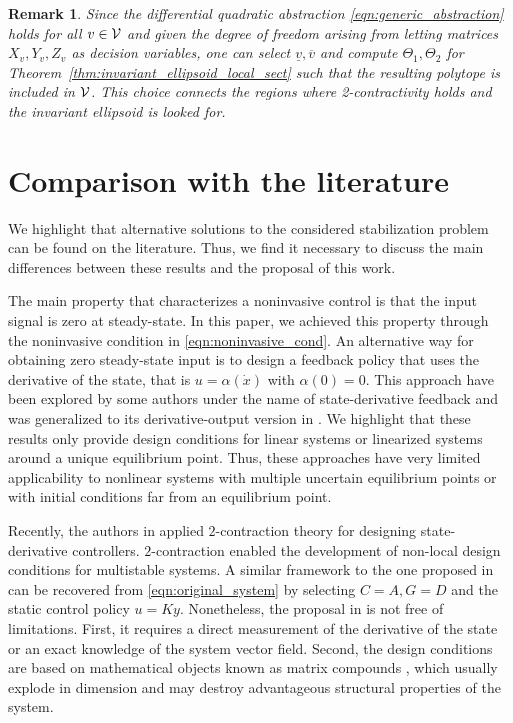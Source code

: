 \documentclass{ifacconf}
\newtheorem{remark}{Remark}
\begin{document}
\begin{remark}
    Since the differential quadratic abstraction \eqref{eqn:generic_abstraction} holds for all $v\in{\mathcal{V}}$ and given the degree of freedom arising from letting matrices $X_v,Y_v,Z_v$ as decision variables, one can select $\underline v, \overbar v$ and compute $\Theta_1,\Theta_2$ for Theorem~\ref{thm:invariant_ellipsoid_local_sect} such that the resulting polytope is included in ${\mathcal{V}}$. This choice connects the regions where 2-contractivity holds and the invariant ellipsoid is looked for.
\end{remark}

\section{Comparison with the literature}\label{sec:comparison_lit}
We highlight that alternative solutions to the considered stabilization problem can be found on the literature. Thus, we find it necessary to discuss the main differences between these results and the proposal of this work.

The main property that characterizes a noninvasive control is that the input signal is zero at steady-state. In this paper, we achieved this property through the noninvasive condition in \eqref{eqn:noninvasive_cond}. An alternative way for obtaining zero steady-state input is to design a feedback policy that uses the derivative of the state, that is $u = \alpha(\dot x)$ with $\alpha(0)=0$. This approach have been explored by some authors under the name of state-derivative feedback \citep{ZAHEER2021109495,Arthur2019} and was generalized to its derivative-output version in \citep{ZAHEER2021109495,ARTHUR202040}. We highlight that these results only provide design conditions for linear systems or linearized systems around a unique equilibrium point. Thus, these approaches have very limited applicability to nonlinear systems with multiple uncertain equilibrium points or with initial conditions far from an equilibrium point. 

Recently, the authors in \citep{ANGELI2024152} applied $2$-contraction theory for designing state-derivative controllers. $2$-contraction enabled the development of non-local design conditions for multistable systems. A similar framework to the one proposed in \citep{ANGELI2024152} can be recovered from \eqref{eqn:original_system} by selecting $C=A, G=D$ and the static control policy $u=Ky$. Nonetheless, the proposal in \citep{ANGELI2024152} is not free of limitations. First, it requires a direct measurement of the derivative of the state or an exact knowledge of the system vector field. Second, the design conditions are based on mathematical objects known as matrix compounds \citep{bar2023compound}, which usually explode in dimension and may destroy advantageous structural properties of the system. 
\end{document}
